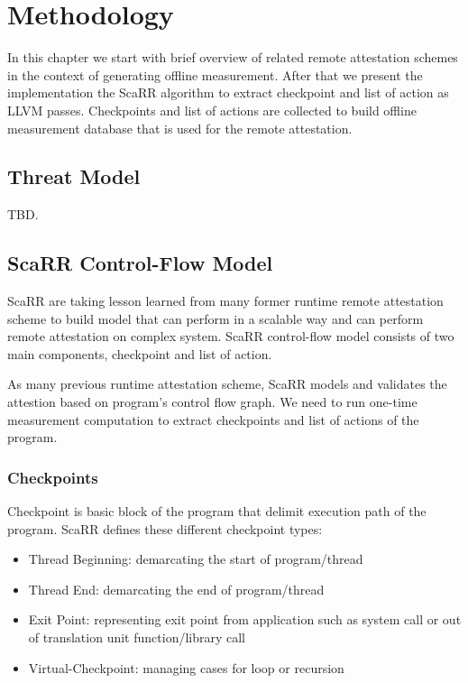 
\chapter{Methodology} %

\label{Chapter4} %

In this chapter we start with brief overview of related remote attestation schemes in the context of generating offline measurement. After that we present the implementation the ScaRR algorithm to extract checkpoint and list of action as LLVM passes. Checkpoints and list of actions are collected to build offline measurement database that is used for the remote attestation.

\section{Threat Model}

TBD.

\section{ScaRR Control-Flow Model}

ScaRR \cite{toffaliniScaRRScalableRuntime2019} are taking lesson learned from many former runtime remote attestation scheme to build model that can perform in a scalable way and can perform remote attestation on complex system. ScaRR control-flow model consists of two main components, checkpoint and list of action. 

As many previous runtime attestation scheme, ScaRR models and validates the attestion based on program's control flow graph. We need to run one-time measurement computation to extract checkpoints and list of actions of the program.

\subsection{Checkpoints}
Checkpoint is basic block of the program that delimit execution path of the program. ScaRR defines these different checkpoint types:
\begin{itemize}
    \item Thread Beginning: demarcating the start of program/thread
    \item Thread End: demarcating the end of program/thread
    \item Exit Point: representing exit point from application such as system call or out of translation unit function/library call
    \item Virtual-Checkpoint: managing cases for loop or recursion
\end{itemize}


